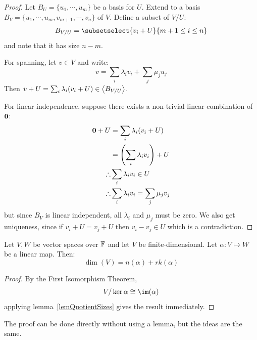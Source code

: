 \documentclass[../Main.tex]{subfiles}
\begin{document}
\begin{proof}
    Let $B_U = \{u_1, \cdots, u_m\}$ be a basis for $U$. Extend to a basis $B_V = \{u_1, \cdots, u_m, v_{m+1}, \cdots, v_n\}$ of $V$. Define a subset of $V / U$:
    \begin{equation*}
        B_{V / U} = \subsetselect{v_i + U}{m+1 \leq i \leq n}
    \end{equation*}
    and note that it has size $n - m$.

    For spanning, let $v \in V$ and write:
    \begin{equation*}
        v = \sum_{i} \lambda_i v_i + \sum_{j} \mu_j u_j
    \end{equation*}
    Then $v + U = \sum_i \lambda_i(v_i + U) \in \left\langle B_{V / U} \right\rangle$.

    For linear independence, suppose there exists a non-trivial linear combination of $\boldsymbol{0}$:
    \begin{align*}
        \boldsymbol{0} + U &= \sum_i \lambda_i(v_i + U) \\
        &= \left(\sum_i \lambda_i v_i\right) + U \\
        \therefore &\sum_i \lambda_i v_i \in U \\
        \therefore &\sum_i \lambda_i v_i = \sum_j \mu_j v_j
    \end{align*}
    but since $B_V$ is linear independent, all $\lambda_i$ and $\mu_j$ must be zero. We also get uniqueness, since if $v_i + U = v_j + U$ then $v_i - v_j \in U$ which is a contradiction.
\end{proof}
\begin{theorem}
    Let $V, W$ be vector spaces over $\mathbb{F}$ and let $V$ be finite-dimensional. Let $\alpha : V \mapsto W$ be a linear map. Then:
    \begin{equation}
        \dim(V) = n(\alpha) + rk(\alpha)
        \label{eqnRankNullity}
    \end{equation}
    \label{thmRankNullity}
\end{theorem}
\begin{proof}
    By the First Isomorphism Theorem,
    \begin{equation*}
        V / \ker{\alpha} \isom \im(\alpha)
    \end{equation*}
    applying lemma~\ref{lemQuotientSizes} gives the result immediately.
\end{proof}
\begin{remark}
    The proof can be done directly without using a lemma, but the ideas are the same.
\end{remark}
\end{document}
